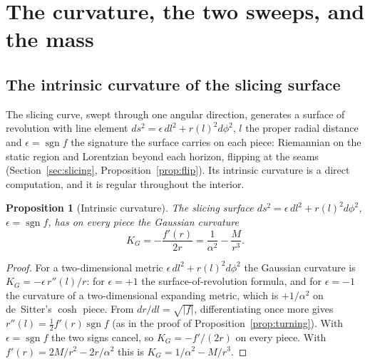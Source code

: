 \documentclass[11pt,a4paper]{article}
\newtheorem{proposition}[theorem]{Proposition}
\theoremstyle{definition}
\begin{document}
\section{The curvature, the two sweeps, and the mass}\label{sec:geometry}

\subsection{The intrinsic curvature of the slicing surface}\label{sec:curvature}

The slicing curve, swept through one angular direction, generates a surface of revolution with line element $ds^{2}=\epsilon\,dl^{2}+r(l)^{2}d\phi^{2}$, $l$ the proper radial distance and $\epsilon=\operatorname{sgn}f$ the signature the surface carries on each piece: Riemannian on the static region and Lorentzian beyond each horizon, flipping at the seams (Section~\ref{sec:slicing}, Proposition~\ref{prop:flip}). Its intrinsic curvature is a direct computation, and it is regular throughout the interior.

\begin{proposition}[Intrinsic curvature]\label{prop:curvature}
The slicing surface $ds^{2}=\epsilon\,dl^{2}+r(l)^{2}d\phi^{2}$, $\epsilon=\operatorname{sgn}f$, has on every piece the Gaussian curvature
\begin{equation}\label{eq:KG}
  K_{G}=-\frac{f'(r)}{2r}=\frac{1}{\alpha^{2}}-\frac{M}{r^{3}} .
\end{equation}
\end{proposition}

\begin{proof}
For a two-dimensional metric $\epsilon\,dl^{2}+r(l)^{2}d\phi^{2}$ the Gaussian curvature is $K_{G}=-\epsilon\,r''(l)/r$: for $\epsilon=+1$ the surface-of-revolution formula, and for $\epsilon=-1$ the curvature of a two-dimensional expanding metric, which is $+1/\alpha^{2}$ on de~Sitter's $\cosh$ piece. From $dr/dl=\sqrt{|f|}$, differentiating once more gives $r''(l)=\tfrac12 f'(r)\operatorname{sgn}f$ (as in the proof of Proposition~\ref{prop:turning}). With $\epsilon=\operatorname{sgn}f$ the two signs cancel, so $K_{G}=-f'/(2r)$ on every piece. With $f'(r)=2M/r^{2}-2r/\alpha^{2}$ this is $K_{G}=1/\alpha^{2}-M/r^{3}$.
\end{proof}
\end{document}
